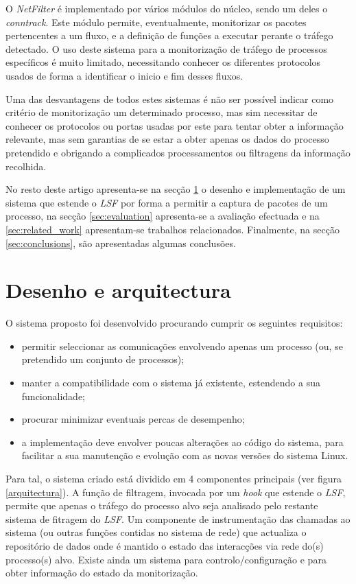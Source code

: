\documentclass[a4paper]{llncs}
\begin{document}
O \textit{NetFilter} é implementado por vários módulos do núcleo, sendo um deles o \textit{conntrack}\cite{CTS}.
 Este módulo permite, eventualmente, monitorizar os pacotes pertencentes a um fluxo, e a definição de funções a executar perante o tráfego detectado.
 O uso deste sistema para a monitorização de tráfego de processos específicos é muito limitado, necessitando conhecer os diferentes protocolos usados de forma a identificar o inicio e fim desses fluxos. 


Uma das desvantagens de todos estes sistemas é não ser possível indicar como critério de monitorização um determinado processo, mas sim necessitar de conhecer os protocolos ou portas usadas por este para tentar obter a informação relevante, mas sem garantias de se estar a obter apenas os dados do processo pretendido e obrigando a complicados processamentos ou filtragens da informação recolhida.

No resto deste artigo apresenta-se na secção \ref{sec:architecture} o desenho e implementação de um sistema que estende o \textit{LSF} por forma a permitir a captura de pacotes de um processo, na secção \ref{sec:evaluation} apresenta-se a avaliação efectuada e na \ref{sec:related_work} apresentam-se trabalhos relacionados.
 Finalmente, na secção \ref{sec:conclusions}, são apresentadas algumas conclusões.

\section{Desenho e arquitectura}
\label{sec:architecture}

O sistema proposto foi desenvolvido procurando cumprir os seguintes requisitos:
\begin{itemize}
\item permitir seleccionar as comunicações envolvendo apenas um processo (ou, se pretendido um conjunto de processos);
\item manter a compatibilidade com o sistema já existente, estendendo a sua funcionalidade;
\item procurar minimizar eventuais percas de desempenho;
\item a implementação deve envolver poucas alterações ao código do sistema, para facilitar a sua manutenção e evolução com as novas versões do sistema Linux.
\end{itemize}

Para tal, o sistema criado está dividido em 4 componentes principais (ver figura \ref{arquitectura}).
 A função de filtragem, invocada por um \textit{hook} que estende o \textit{LSF}, permite que apenas o tráfego do processo alvo seja analisado pelo restante sistema de fitragem do \textit{LSF}.
 Um componente de instrumentação das chamadas ao sistema (ou outras funções contidas no sistema de rede) que actualiza o repositório de dados onde é mantido o estado das interacções via rede do(s) processo(s) alvo. Existe ainda um sistema para controlo/configuração e para obter informação do estado da monitorização.
\end{document}
